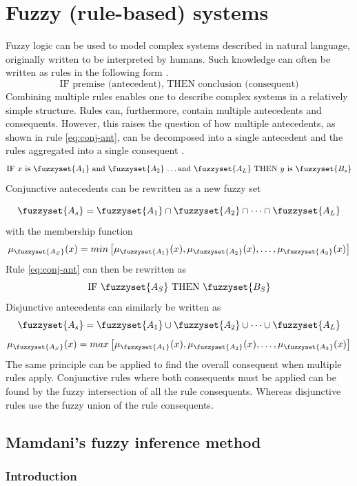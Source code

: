 \section{Fuzzy (rule-based) systems}
Fuzzy logic can be used to model complex systems described in natural language, originally written to be interpreted by humans. Such knowledge can often be written as rules in the following form \cite{ross2009fuzzy}.
\begin{equation}
    \text{IF premise (antecedent), THEN conclusion (consequent)}
\end{equation}
Combining multiple rules enables one to describe complex systems in a relatively simple structure. Rules can, furthermore, contain multiple antecedents and consequents. However, this raises the question of how multiple antecedents, as shown in rule \ref{eq:conj-ant}, can be  decomposed into a single antecedent and the rules aggregated into a single consequent \cite{ross2009fuzzy}.
\begin{equation}
    \text {IF $x$ is $\fuzzyset{A_1}$ and $\fuzzyset{A_2}$ \dots and $\fuzzyset{A_L}$ THEN $y$ is $\fuzzyset{B_s}$}
    \label{eq:conj-ant}
\end{equation}
Conjunctive antecedents can be rewritten as a new fuzzy set

\[ \fuzzyset{A_s}=\fuzzyset{A_1}\cap \fuzzyset{A_2} \cap \dots \cap \fuzzyset{A_L} \]
with the membership function
\[ \mu_{\fuzzyset{A_S}}(x)=min \left [\mu_{\fuzzyset{A_1}}(x),\mu_{\fuzzyset{A_2}}(x),\dots,\mu_{\fuzzyset{A_3}}(x) \right ] \]
Rule \ref{eq:conj-ant} can then be rewritten as
\[ \text{IF $\fuzzyset{A_S}$ THEN $\fuzzyset{B_S}$} \]
Disjunctive antecedents can similarly be written as
\[ \fuzzyset{A_s}=\fuzzyset{A_1}\cup \fuzzyset{A_2} \cup \dots \cup \fuzzyset{A_L} \]
\[ \mu_{\fuzzyset{A_S}}(x)=max \left [\mu_{\fuzzyset{A_1}}(x),\mu_{\fuzzyset{A_2}}(x),\dots,\mu_{\fuzzyset{A_3}}(x) \right ] \]
The same principle can be applied to find the overall consequent when multiple rules apply. Conjunctive rules where both consequents must be applied can be found by  the fuzzy intersection of all the rule consequents. Whereas disjunctive rules use the fuzzy union of the rule consequents.
\subsection{Mamdani's fuzzy inference method}
\subsubsection{Introduction}
